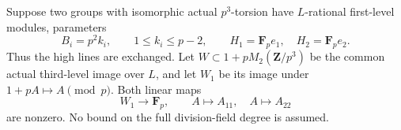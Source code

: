 \begin{lemma}
\label{lem:B-RD85-diagonal}
Suppose two groups with isomorphic actual \(p^3\)-torsion
have \(L\)-rational first-level modules, parameters
\[
 B_i=p^2k_i,\qquad 1\le k_i\le p-2,
       \qquad H_1=\mathbf F_pe_1,\quad H_2=\mathbf F_pe_2.
                                                        \tag{B-RD85.1}
\]
Thus the high lines are exchanged. Let
\(W\subset1+pM_2(\mathbf Z/p^3)\) be the common actual
third-level image over \(L\), and let \(W_1\) be its
image under \(1+pA\longmapsto A\pmod p\).
Both linear maps
\[
        W_1\longrightarrow\mathbf F_p,
        \qquad A\longmapsto A_{11},\quad A\longmapsto A_{22}
                                                        \tag{B-RD85.2}
\]
are nonzero. No bound on the full division-field degree
is assumed.
\end{lemma}
